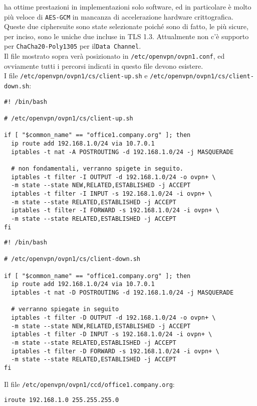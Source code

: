 ha ottime prestazioni in implementazioni solo software, ed in particolare è molto
più veloce di \texttt{AES-GCM} in mancanza di accelerazione hardware crittografica.
Queste due ciphersuite sono state selezionate poiché sono di fatto, le più sicure,
per inciso, sono le uniche due incluse in TLS 1.3. Attualmente non c'è supporto
per \texttt{ChaCha20-Poly1305} per il\texttt{Data Channel}.\\
Il file mostrato sopra verà posizionato in \texttt{/etc/openvpn/ovpn1.conf}, ed
ovviamente tutti i percorsi indicati in questo file devono esistere.\\
I file \texttt{/etc/openvpn/ovpn1/cs/client-up.sh} e
\texttt{/etc/openvpn/ovpn1/cs/client-down.sh}:
\begin{verbatim}
#! /bin/bash

# /etc/openvpn/ovpn1/cs/client-up.sh

if [ "$common_name" == "office1.company.org" ]; then
  ip route add 192.168.1.0/24 via 10.7.0.1
  iptables -t nat -A POSTROUTING -d 192.168.1.0/24 -j MASQUERADE

  # non fondamentali, verranno spigete in seguito.
  iptables -t filter -I OUTPUT -d 192.168.1.0/24 -o ovpn+ \
  -m state --state NEW,RELATED,ESTABLISHED -j ACCEPT
  iptables -t filter -I INPUT -s 192.168.1.0/24 -i ovpn+ \
  -m state --state RELATED,ESTABLISHED -j ACCEPT
  iptables -t filter -I FORWARD -s 192.168.1.0/24 -i ovpn+ \
  -m state --state RELATED,ESTABLISHED -j ACCEPT
fi
\end{verbatim}

\begin{verbatim}
#! /bin/bash

# /etc/openvpn/ovpn1/cs/client-down.sh

if [ "$common_name" == "office1.company.org" ]; then
  ip route add 192.168.1.0/24 via 10.7.0.1
  iptables -t nat -D POSTROUTING -d 192.168.1.0/24 -j MASQUERADE

  # verranno spiegate in seguito
  iptables -t filter -D OUTPUT -d 192.168.1.0/24 -o ovpn+ \
  -m state --state NEW,RELATED,ESTABLISHED -j ACCEPT
  iptables -t filter -D INPUT -s 192.168.1.0/24 -i ovpn+ \
  -m state --state RELATED,ESTABLISHED -j ACCEPT
  iptables -t filter -D FORWARD -s 192.168.1.0/24 -i ovpn+ \
  -m state --state RELATED,ESTABLISHED -j ACCEPT
fi
\end{verbatim}
Il file \texttt{/etc/openvpn/ovpn1/ccd/office1.company.org}:
\begin{verbatim}
iroute 192.168.1.0 255.255.255.0
\end{verbatim}

